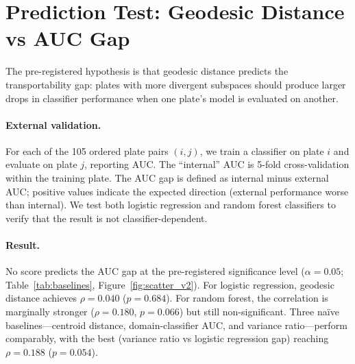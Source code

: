 \documentclass{article}
\begin{document}
\section{Prediction Test: Geodesic Distance vs AUC Gap}
\label{sec:prediction}

The pre-registered hypothesis is that geodesic distance predicts the transportability gap: plates with more divergent subspaces should produce larger drops in classifier performance when one plate's model is evaluated on another.

\paragraph{External validation.} For each of the 105 ordered plate pairs $(i, j)$, we train a classifier on plate $i$ and evaluate on plate $j$, reporting AUC. The ``internal'' AUC is 5-fold cross-validation within the training plate. The AUC gap is defined as internal minus external AUC; positive values indicate the expected direction (external performance worse than internal). We test both logistic regression and random forest classifiers to verify that the result is not classifier-dependent.

\paragraph{Result.} No score predicts the AUC gap at the pre-registered significance level ($\alpha = 0.05$; Table~\ref{tab:baselines}, Figure~\ref{fig:scatter_v2}). For logistic regression, geodesic distance achieves $\rho = 0.040$ ($p = 0.684$). For random forest, the correlation is marginally stronger ($\rho = 0.180$, $p = 0.066$) but still non-significant. Three na\"{i}ve baselines---centroid distance, domain-classifier AUC, and variance ratio---perform comparably, with the best (variance ratio vs logistic regression gap) reaching $\rho = 0.188$ ($p = 0.054$).
\end{document}
